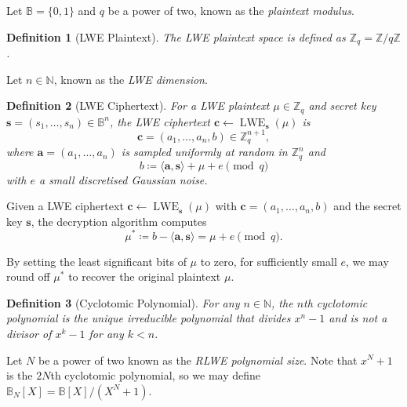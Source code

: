 \documentclass{article}
\newtheorem{definition}{Definition}
\DeclareMathOperator{\lwe}{LWE}
\begin{document}
Let $\mathbb{B} = \{0, 1\}$ and $q$ be a power of two, known as the \emph{plaintext
modulus}. %

\begin{definition}[LWE Plaintext]
  The LWE plaintext space is defined as $\mathbb{Z}_q = \mathbb{Z}/q\mathbb{Z}$.
\end{definition}

Let $n \in \mathbb{N}$, known as the \emph{LWE dimension}.

\begin{definition}[LWE Ciphertext]
  For a LWE plaintext $\mu \in \mathbb{Z}_q$ and secret key $\bm{s} = (s_1, \ldots, s_n)
  \in \mathbb{B}^n$, the LWE ciphertext $\bm{c} \leftarrow \lwe_{\bm{s}}(\mu)$ is
  \begin{equation}
    \bm{c} = (a_1, \ldots, a_n, b) \in \mathbb{Z}_q^{n+1},
  \end{equation} where $\bm{a} = (a_1, \ldots, a_n)$ is sampled uniformly at random in
  $\mathbb{Z}_q^n$ and \begin{equation}
    b \coloneqq \langle \bm{a}, \bm{s} \rangle + \mu + e \pmod{q}
  \end{equation} with $e$ a small discretised Gaussian noise.

\end{definition}

Given a LWE ciphertext $\bm{c} \leftarrow \lwe_{\bm{s}}(\mu)$ with $\bm{c} = (a_1,
\ldots, a_n, b)$ and the secret key $\bm{s}$, the decryption algorithm computes
\begin{equation}
  \mu^* \coloneqq b - \langle \bm{a}, \bm{s} \rangle = \mu + e \pmod{q}.
\end{equation}

By setting the least significant bits of $\mu$ to zero, for sufficiently small $e$, we
may round off $\mu^*$ to recover the original plaintext $\mu$.

\begin{definition}[Cyclotomic Polynomial]
  For any $n \in \mathbb{N}$, the $n$th cyclotomic polynomial is the unique irreducible
  polynomial that divides $x^n - 1$ and is not a divisor of $x^k - 1$ for any $k < n$.
\end{definition}

Let $N$ be a power of two known as the \emph{RLWE polynomial size}. Note that $x^N + 1$
is the $2N$th cyclotomic polynomial, so we may define $\mathbb{B}_N[X] = \mathbb{B}[X]/
(X^N + 1)$. %
\end{document}

